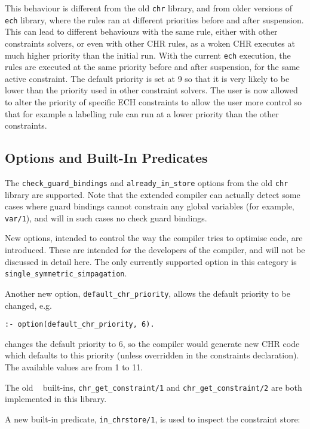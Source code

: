 This behaviour is different from the old {\tt chr} library, and from older
versions of {\tt ech} library, where the rules ran at different
priorities before and after suspension. This can lead to different
behaviours with the same rule, either with other constraints solvers, or
even with other CHR rules, as a woken CHR executes at much higher priority
than the initial run. With the current {\tt ech} execution, the rules are
executed at the same priority before and after suspension, for the same
active constraint. The default priority is set at 9 so that it is very
likely to be lower than the priority used in other constraint solvers. The
user is now allowed to alter the priority of specific ECH constraints to
allow the user more control so that for example a labelling rule can run at
a lower priority than the other constraints.

\subsection{Options and Built-In Predicates}

The \verb'check_guard_bindings' and \verb'already_in_store' options from
the old {\tt chr} library are supported. Note that the extended compiler can
actually detect some cases where guard bindings cannot constrain any global
variables (for example, \verb'var/1'), and will in such cases no check 
guard bindings.

New options, intended to control the way the compiler tries to optimise
code, are introduced. These are intended for the developers of the compiler,
and will not be discussed in detail here. The only currently supported 
option in this category is \verb'single_symmetric_simpagation'.

Another new option, \verb'default_chr_priority', allows the default
priority to be changed, e.g.

\begin{verbatim}
:- option(default_chr_priority, 6).
\end{verbatim}

\noindent
changes the default priority to 6, so the compiler would generate new CHR
code which defaults to this priority (unless overridden in the constraints
declaration). The available values are from 1 to 11.

The old {\chr\ } built-ins, \verb'chr_get_constraint/1' and
\verb'chr_get_constraint/2' are both implemented in this library.

A new built-in predicate, \verb'in_chrstore/1', is used to inspect the
constraint store:


